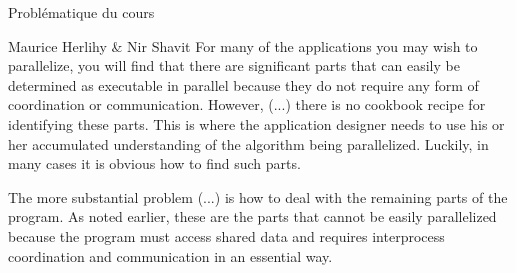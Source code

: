 
\begingroup

\begin{frame}{Problématique du cours}
    \begin{shadequote}{Maurice Herlihy \& Nir Shavit}
    For many of the applications you may wish to parallelize, you will find that there are significant parts that can easily be determined
    as executable in parallel because they do not require any form of coordination or communication. However, (...)
    \alert{there is no cookbook recipe for identifying these parts}. This is where the application designer needs to use
    his or her accumulated understanding of the algorithm being parallelized. Luckily, in many cases it is obvious how to find such parts.
    
    \vspace{4mm}
    \alert{The more substantial problem} (...)
    \alert{is how to deal with the remaining parts of the program.} As noted earlier, these are the parts that cannot be easily parallelized
    because the program must access shared data and requires interprocess coordination and communication in an essential way.
    \end{shadequote}
\end{frame}



\endgroup
\endinput
